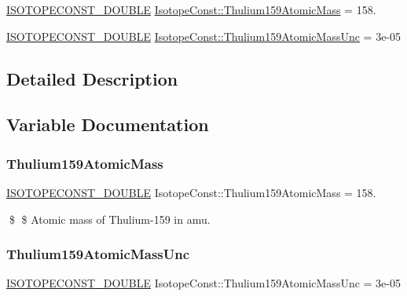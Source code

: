 \begin{DoxyCompactItemize}
\item 
\mbox{\hyperlink{group___isotope_const-_macros_ga8f45a7272ce02c0b4c65c44636ed719a}{I\+S\+O\+T\+O\+P\+E\+C\+O\+N\+S\+T\+\_\+\+D\+O\+U\+B\+LE}} \mbox{\hyperlink{group___isotope_const-_thulium-_tm159_ga05190f0ad0750a9b4c1e8855561b9335}{Isotope\+Const\+::\+Thulium159\+Atomic\+Mass}} = 158.
\item 
\mbox{\hyperlink{group___isotope_const-_macros_ga8f45a7272ce02c0b4c65c44636ed719a}{I\+S\+O\+T\+O\+P\+E\+C\+O\+N\+S\+T\+\_\+\+D\+O\+U\+B\+LE}} \mbox{\hyperlink{group___isotope_const-_thulium-_tm159_ga855cce52679de6f1bf1d04b9eaa3db32}{Isotope\+Const\+::\+Thulium159\+Atomic\+Mass\+Unc}} = 3e-\/05
\end{DoxyCompactItemize}


\subsection{Detailed Description}


\subsection{Variable Documentation}
\mbox{\label{group___isotope_const-_thulium-_tm159_ga05190f0ad0750a9b4c1e8855561b9335}} 
\subsubsection{\texorpdfstring{Thulium159\+Atomic\+Mass}{Thulium159AtomicMass}}
{\footnotesize\ttfamily \mbox{\hyperlink{group___isotope_const-_macros_ga8f45a7272ce02c0b4c65c44636ed719a}{I\+S\+O\+T\+O\+P\+E\+C\+O\+N\+S\+T\+\_\+\+D\+O\+U\+B\+LE}} Isotope\+Const\+::\+Thulium159\+Atomic\+Mass = 158.}

\$ \$ Atomic mass of Thulium-\/159 in amu. \mbox{\label{group___isotope_const-_thulium-_tm159_ga855cce52679de6f1bf1d04b9eaa3db32}} 
\subsubsection{\texorpdfstring{Thulium159\+Atomic\+Mass\+Unc}{Thulium159AtomicMassUnc}}
{\footnotesize\ttfamily \mbox{\hyperlink{group___isotope_const-_macros_ga8f45a7272ce02c0b4c65c44636ed719a}{I\+S\+O\+T\+O\+P\+E\+C\+O\+N\+S\+T\+\_\+\+D\+O\+U\+B\+LE}} Isotope\+Const\+::\+Thulium159\+Atomic\+Mass\+Unc = 3e-\/05}

